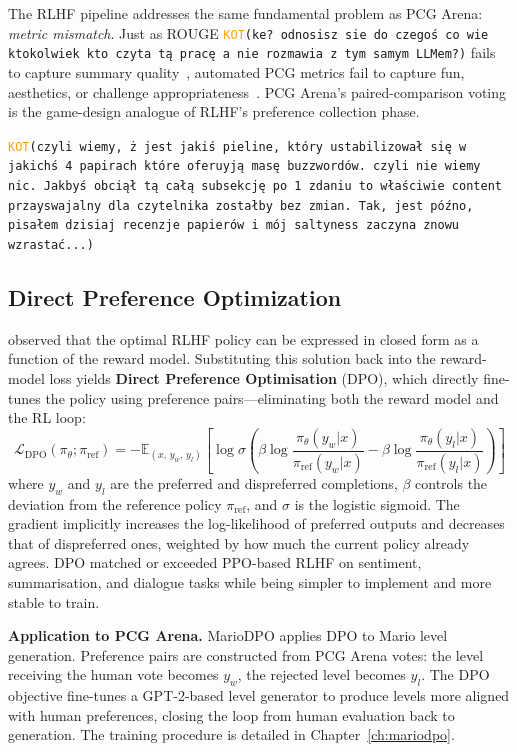 \documentclass[shortabstract, mgr, english]{iithesis}
\newcommand{\DEBUG}[1]{{#1}} %
\newcommand{\KOT}[1]{\DEBUG{\tt{\textcolor{orange}{KOT}(}{#1}{)}}}
\begin{document}
The RLHF pipeline addresses the same fundamental problem as PCG Arena:
\emph{metric mismatch}. Just as ROUGE \KOT{ke? odnosisz sie do czegoś co wie ktokolwiek kto czyta tą pracę a nie rozmawia z tym samym LLMem?} fails to capture summary
quality~\citep{stiennon2020learning}, automated PCG metrics fail to capture fun,
aesthetics, or challenge appropriateness~\citep{marino2015empirical}. PCG Arena's
paired-comparison voting is the game-design analogue of RLHF's preference
collection phase.

\KOT{czyli wiemy, ż jest jakiś pieline, który ustabilizował się w jakichś 4 papirach które oferuyją masę buzzwordów. czyli nie wiemy nic. Jakbyś obciął tą całą subsekcję po 1 zdaniu to właściwie content przayswajalny dla czytelnika zostałby bez zmian. Tak, jest późno, pisałem dzisiaj recenzje papierów i mój saltyness zaczyna znowu wzrastać...}

\subsection{Direct Preference Optimization}
\label{subsec:bg-dpo}

\citet{rafailov2023direct} observed that the optimal RLHF policy can be expressed
in closed form as a function of the reward model. Substituting this solution back
into the reward-model loss yields \textbf{Direct Preference Optimisation} (DPO),
which directly fine-tunes the policy using preference pairs---eliminating both
the reward model and the RL loop:
%
\begin{equation}
\label{eq:dpo}
\mathcal{L}_{\text{DPO}}(\pi_\theta; \pi_{\text{ref}}) =
  -\mathbb{E}_{(x,\,y_w,\,y_l)}\!\left[
    \log\sigma\!\left(
      \beta\log\frac{\pi_\theta(y_w|x)}{\pi_{\text{ref}}(y_w|x)}
      - \beta\log\frac{\pi_\theta(y_l|x)}{\pi_{\text{ref}}(y_l|x)}
    \right)
  \right]
\end{equation}
%
where $y_w$ and $y_l$ are the preferred and dispreferred completions, $\beta$
controls the deviation from the reference policy $\pi_{\text{ref}}$, and
$\sigma$ is the logistic sigmoid. The gradient implicitly increases the
log-likelihood of preferred outputs and decreases that of dispreferred ones,
weighted by how much the current policy already agrees. DPO matched or exceeded
PPO-based RLHF on sentiment, summarisation, and dialogue tasks while being
simpler to implement and more stable to train.

\textbf{Application to PCG Arena.} MarioDPO applies DPO to Mario level
generation. Preference pairs are constructed from PCG Arena votes: the level
receiving the human vote becomes $y_w$, the rejected level becomes $y_l$. The DPO
objective fine-tunes a GPT-2-based level generator to produce levels more aligned
with human preferences, closing the loop from human evaluation back to
generation. The training procedure is detailed in Chapter~\ref{ch:mariodpo}.
\end{document}
